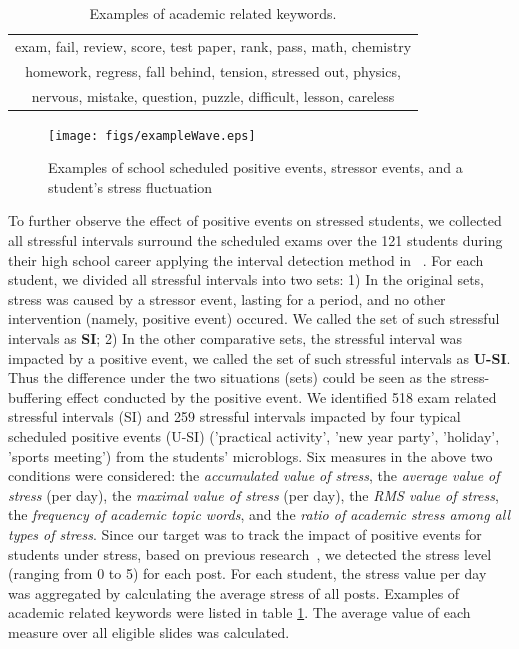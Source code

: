 \begin{table}[h]
\centering
\caption{\small{Examples of academic related keywords.}}
\label{tab:studyWords}
\small{
\begin{tabular}{c}
\toprule
exam, fail, review, score, test paper, rank, pass, math, chemistry\\
homework, regress, fall behind, tension, stressed out, physics,\\
nervous, mistake, question, puzzle, difficult, lesson, careless\\
\bottomrule
\end{tabular}
}
\end{table}


\begin{figure}[H]
\centering
\texttt{[image: figs/exampleWave.eps]}
\caption{\small{Examples of school scheduled positive events, stressor events, and a student's stress fluctuation}}
\label{fig:example}
\end{figure}

To further observe the effect of positive events on stressed students,
we collected all stressful intervals surround the scheduled exams over the 121 students during their high school career
applying the interval detection method in ~\citep{Li2017Analyzing}.
For each student, we divided all stressful intervals into two sets:
1) In the original sets, stress was caused by a stressor event, lasting for a period,
and no other intervention (namely, positive event) occured.
We called the set of such stressful intervals as \textbf{SI};
2) In the other comparative sets,
the stressful interval was impacted by a positive event,
we called the set of such stressful intervals as \textbf{U-SI}.
Thus the difference under the two situations (sets) could be seen as the stress-buffering effect
conducted by the positive event.
We identified 518 exam related stressful intervals (SI)
and 259 stressful intervals impacted by four typical scheduled positive events (U-SI)
('practical activity', 'new year party', 'holiday', 'sports meeting') from the students' microblogs.
Six measures in the above two conditions were considered:
the \emph{accumulated value of stress}, the \emph{average value of stress} (per day),  the \emph{maximal value of stress} (per day),
the \emph{RMS value of stress},
the \emph{frequency of academic topic words}, and the \emph{ratio of academic stress among all types of stress}.
Since our target was to track the impact of positive events for students under stress,
based on previous research~\cite{XueUbicomp13},
we detected the stress level (ranging from 0 to 5) for each post.
For each student,
the stress value per day was aggregated by calculating the average stress of all posts.
Examples of academic related keywords were listed in table \ref{tab:studyWords}.
The average value of each measure over all eligible slides was calculated.


